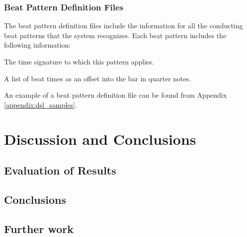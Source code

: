 \subsection{Beat Pattern Definition Files}
\label{sec:beat_pattern_definition_format}

The beat pattern definition files include the
information for all the conducting beat patterns
that the system recognizes.
Each beat pattern includes the following information:
\begin{description}[leftmargin=24ex]
\item[Meter] The time signature to which this pattern applies.
\item[Beats] A list of beat times as an offset into the bar in quarter notes.
\end{description}
An example of a beat pattern definition file can be found from Appendix
\ref{appendix:dsl_samples}.

\chapter{Discussion and Conclusions}
\label{chapter:discussion}


\section{Evaluation of Results}


\section{Conclusions}


\section{Further work}



